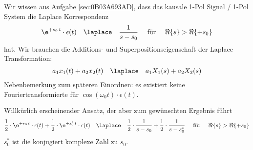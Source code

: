 \begin{Werkzeug}
Wir wissen aus Aufgabe \ref{sec:0B03A693AD}, dass das kausale 1-Pol Signal / 1-Pol System
die Laplace Korrespondenz
\begin{align}
\e^{+s_0 \, t} \cdot \epsilon(t) \quad \laplace \quad \frac{1}{s-s_0} \quad\text{ für } \quad\Re\{s\} > \Re\{+s_0\}
\end{align}
hat.
%
Wir brauchen die Additions- und Superpositionseigenschaft der Laplace Transformation:
\begin{align}
a_1 x_1(t) + a_2 x_2(t) \quad\laplace\quad  a_1 X_1(s) + a_2 X_2(s)
\end{align}
Nebenbemerkung zum späteren Einordnen: es existiert keine Fouriertransformierte für $\cos(\omega_0 t) \cdot \epsilon(t)$.
\end{Werkzeug}
\begin{Ansatz}
Willkürlich erscheinender Ansatz, der aber zum gewünschten Ergebnis führt
\begin{align}
\frac{1}{2}\cdot\e^{+s_0 \, t}\cdot \epsilon(t)+
\frac{1}{2}\cdot\e^{+s_0^* \, t}\cdot \epsilon(t)
\quad \laplace \quad
\frac{1}{2}\cdot\frac{1}{s-s_0} + \frac{1}{2}\cdot\frac{1}{s-s_0^*}
\quad\text{ für } \quad\Re\{s\} > \Re\{+s_0\}
\end{align}
$s_0^*$ ist die konjugiert komplexe Zahl zu $s_0$.
\end{Ansatz}
